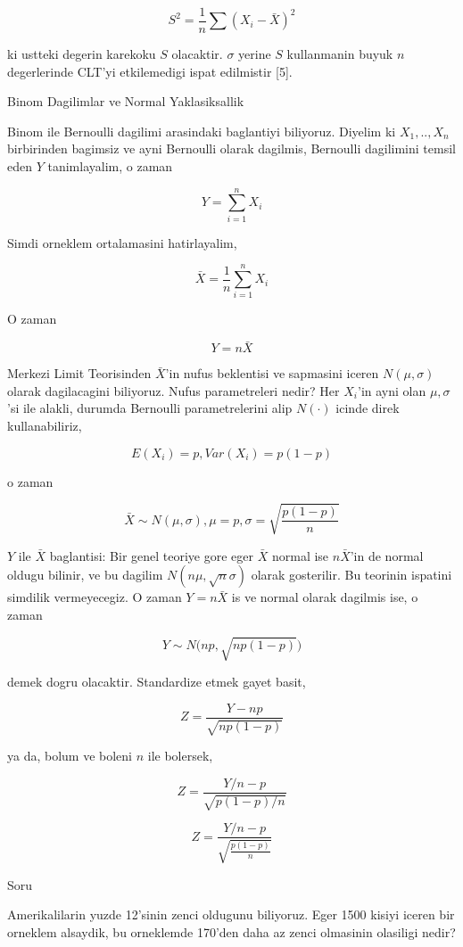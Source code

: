 \documentclass[12pt,fleqn]{article}\usepackage{../common}
\begin{document}
$$ S^2 = \frac{1}{n} \sum (X_i - \bar{X})^2
$$

ki ustteki degerin karekoku $S$ olacaktir. $\sigma$ yerine $S$ kullanmanin 
buyuk $n$ degerlerinde CLT'yi etkilemedigi ispat edilmistir [5]. 


Binom Dagilimlar ve Normal Yaklasiksallik

Binom ile Bernoulli dagilimi arasindaki baglantiyi biliyoruz. Diyelim ki
$X_1,..,X_n$ birbirinden bagimsiz ve ayni Bernoulli olarak dagilmis,
Bernoulli dagilimini temsil eden $Y$ tanimlayalim, o zaman

$$ Y = \sum_{i=1}^n X_i $$

Simdi orneklem ortalamasini hatirlayalim,

$$ \bar{X} = \frac{1}{n}  \sum_{i=1}^n X_i $$

O zaman 

$$ Y = n\bar{X}  $$

Merkezi Limit Teorisinden $\bar{X}$'in nufus beklentisi ve sapmasini iceren
$N(\mu,\sigma)$ olarak dagilacagini biliyoruz. Nufus parametreleri nedir?
Her $X_i$'in ayni olan $\mu,\sigma$'si ile alakli, durumda Bernoulli
parametrelerini alip $N(\cdot)$ icinde direk kullanabiliriz, 

$$E(X_i) = p, Var(X_i) = p(1-p)$$

o zaman 

$$\bar{X} \sim N(\mu,\sigma), \mu = p, \sigma = \sqrt{\frac{p(1-p)}{n}}$$

$Y$ ile $\bar{X}$ baglantisi: Bir genel teoriye gore eger $\bar{X}$ normal
ise $n\bar{X}$'in de normal oldugu bilinir, ve bu dagilim
$N(n\mu,\sqrt{n}\sigma)$ olarak gosterilir. Bu teorinin ispatini simdilik
vermeyecegiz. O zaman $Y = n\bar{X}$ is ve normal olarak dagilmis ise, o zaman 

$$ Y \sim N\bigg(np, \sqrt{np(1-p)}\bigg)$$

demek dogru olacaktir. Standardize etmek gayet basit,


$$Z  = \frac{Y - np}{\sqrt{np(1-p)}}$$

ya da, bolum ve boleni $n$ ile bolersek,

$$Z  = \frac{Y/n - p}{\sqrt{p(1-p)/n}}$$


$$Z  = \frac{Y/n - p}{\sqrt{\frac{p(1-p)}{n}}}$$

Soru

Amerikalilarin yuzde 12'sinin zenci oldugunu biliyoruz. Eger 1500 kisiyi
iceren bir orneklem alsaydik, bu orneklemde 170'den daha az zenci
olmasinin olasiligi nedir? 
\end{document}
